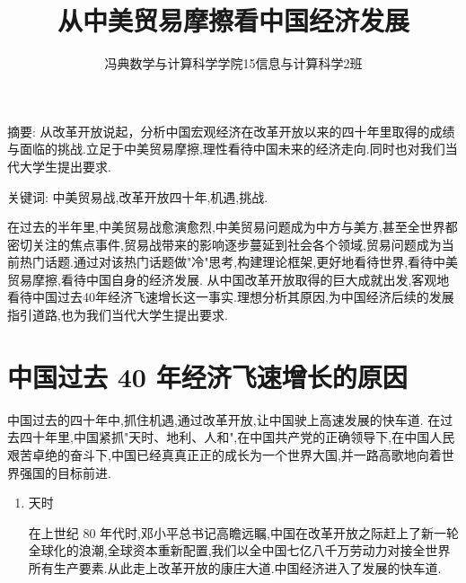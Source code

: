 \documentclass[UTF8]{ctexart} %
\title{\heiti \zihao{2}从中美贸易摩擦看中国经济发展}
\author{\heiti \zihao{4}冯典\qquad 数学与计算科学学院15信息与计算科学2班\qquad 2015750418}
\date{}
\begin{document}
\maketitle

\pagestyle{plain}

\setlength{\baselineskip}{22pt}


{
	
	\kaishu {} 摘\quad 要: 
	\songti {}
	从改革开放说起，分析中国宏观经济在改革开放以来的四十年里取得的成绩与面临的挑战.立足于中美贸易摩擦,理性看待中国未来的经济走向.同时也对我们当代大学生提出要求.
\vspace{0.3cm}

{
	\kaishu {} 关键词: 
	\songti {}中美贸易战,改革开放四十年,机遇,挑战. 
	
}

\vspace{0.6cm}

{
	
	\songti

	

在过去的半年里,中美贸易战愈演愈烈,中美贸易问题成为中方与美方,甚至全世界都密切关注的焦点事件,贸易战带来的影响逐步蔓延到社会各个领域,贸易问题成为当前热门话题.通过对该热门话题做"冷"思考,构建理论框架,更好地看待世界,看待中美贸易摩擦,看待中国自身的经济发展.
从中国改革开放取得的巨大成就出发,客观地看待中国过去40年经济飞速增长这一事实.理想分析其原因,为中国经济后续的发展指引道路,也为我们当代大学生提出要求.

	
	\section{中国过去 40 年经济飞速增长的原因}
	
	
中国过去的四十年中,抓住机遇,通过改革开放,让中国驶上高速发展的快车道.
在过去四十年里,中国紧抓"天时、地利、人和",在中国共产党的正确领导下,在中国人民艰苦卓绝的奋斗下,中国已经真真正正的成长为一个世界大国,并一路高歌地向着世界强国的目标前进.

\begin{enumerate}

\item 天时

在上世纪 80 年代时,邓小平总书记高瞻远瞩,中国在改革开放之际赶上了新一轮全球化的浪潮,全球资本重新配置,我们以全中国七亿八千万劳动力对接全世界所有生产要素.从此走上改革开放的康庄大道.中国经济进入了发展的快车道.


\end{enumerate}}}
\end{document}
